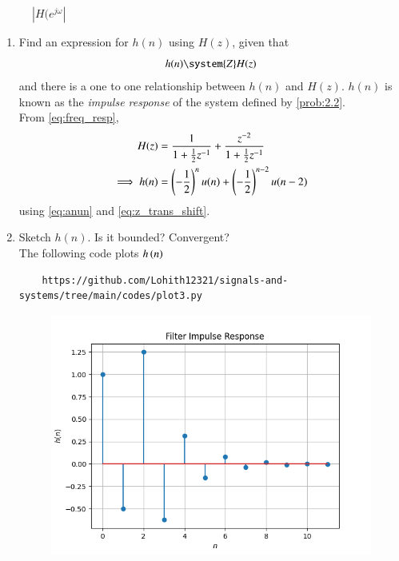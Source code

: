 \documentclass[journal,12pt,twocolumn]{IEEEtran}
\theoremstyle{remark}
\begin{document}
\begin{enumerate}[label=\thesection.\arabic*
,ref=\thesection.\theenumi]
\begin{enumerate}[label=\thesection.\arabic*
,ref=\thesection.\theenumi]
\begin{figure}[ht]
\begin{center}
    \caption{$|H(e^{j\omega}|$}
\end{center}
    
    \label{fig:}
\end{figure}
\begin{enumerate}[label=\thesection.\arabic*
,ref=\thesection.\theenumi]
\section{Impulsive Response}
\item \label{prob:impulse_resp}
Find an expression for $h(n)$ using $H(z)$, given that 
\begin{equation}
\label{eq:impulse_resp}
h(n) \system{Z} H(z)
\end{equation}
and there is a one to one relationship between $h(n)$ and $H(z)$. $h(n)$ is known as the {\em impulse response} of the
system defined by \eqref{prob:2.2}.
\\
\solution From \eqref{eq:freq_resp},
\begin{align}
H(z) &= \frac{1}{1 + \frac{1}{2}z^{-1}} + \frac{ z^{-2}}{1 + \frac{1}{2}z^{-1}}
\\
\implies h(n) &= \left(-\frac{1}{2}\right)^{n}u(n) + \left(-\frac{1}{2}\right)^{n-2}u(n-2)
\end{align}
using \eqref{eq:anun} and \eqref{eq:z_trans_shift}.
\item Sketch $h(n)$. Is it bounded? Convergent? \\
\solution The following code plots $h\left(n\right)$ 
\begin{lstlisting}
    https://github.com/Lohith12321/signals-and-systems/tree/main/codes/plot3.py
\end{lstlisting}
\begin{figure}[ht]
    \centering  
\includegraphics[width=\columnwidth]{figs/plot3.png}

\end{figure}
\end{enumerate}
\end{enumerate}
\end{enumerate}
\end{document}
